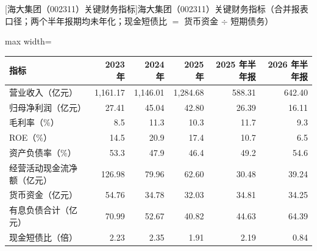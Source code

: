 \begin{center}\small\setlength{\tabcolsep}{3.4pt}
[海大集团（002311）关键财务指标]{海大集团（002311）关键财务指标（合并报表口径；两个半年报期均未年化；现金短债比 $=$ 货币资金 $\div$ 短期债务）}
\begin{adjustbox}{max width=\textwidth}
\begin{tabular}{@{}lrrrrr@{}}
\toprule
指标 & 2023 年 & 2024 年 & 2025 年 & 2025 年半年报 & 2026 年半年报 \\
\midrule
营业收入（亿元） & 1,161.17 & 1,146.01 & 1,284.68 & 588.31 & 642.40 \\
归母净利润（亿元） & 27.41 & 45.04 & 42.80 & 26.39 & 16.11 \\
毛利率（\%） & 8.5 & 11.3 & 10.3 & 11.7 & 9.3 \\
ROE（\%） & 14.5 & 20.9 & 17.4 & 10.7 & 6.5 \\
资产负债率（\%） & 53.3 & 47.9 & 46.4 & 49.2 & 54.6 \\
经营活动现金流净额（亿元） & 126.98 & 79.96 & 62.60 & 30.48 & 39.24 \\
货币资金（亿元） & 54.76 & 34.78 & 32.03 & 34.81 & 34.25 \\
有息负债合计（亿元） & 70.99 & 52.67 & 40.82 & 44.63 & 64.39 \\
现金短债比（倍） & 2.23 & 2.35 & 1.91 & 2.19 & 0.84 \\
\bottomrule
\end{tabular}
\end{adjustbox}
\end{center}

